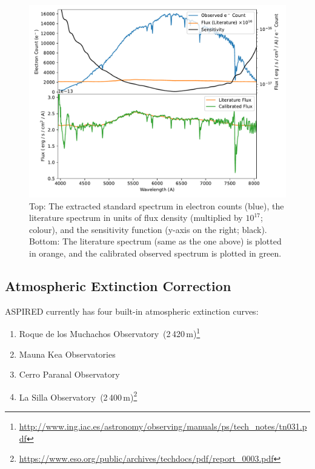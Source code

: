 \documentclass[linenumbers, twocolumn]{aastex631}
\begin{document}
\begin{figure}
    \centering
    \includegraphics[width=\columnwidth]{fig_06_flux_calibration_diagnostics.pdf}
    \caption{Top: The extracted standard spectrum in electron counts
    (blue), the literature spectrum in units of flux density (multiplied
    by $10^{17}$; colour), and the sensitivity function (y-axis on the right; black).
    Bottom: The literature spectrum (same as the one above) is plotted
    in orange, and the calibrated observed spectrum is plotted in green.}
    \label{fig:fluxcal}
\end{figure}

\subsection{Atmospheric Extinction Correction}
\textsc{ASPIRED} currently has four built-in atmospheric extinction curves:

\begin{enumerate}
    \item Roque de los Muchachos Observatory~(2\,420\,m)\footnote{\url{http://www.ing.iac.es/astronomy/observing/manuals/ps/tech\_notes/tn031.pdf}}
    \item Mauna Kea Observatories~\citep[4\,205\,m;][]{2013A&A...549A...8B}
    \item Cerro Paranal Observatory~\citep[2\,635\,m;][]{2011A&A...527A..91P}
    \item La Silla Observatory~(2\,400\,m)\footnote{\url{https://www.eso.org/public/archives/techdocs/pdf/report\_0003.pdf}}
\end{enumerate}
\end{document}
